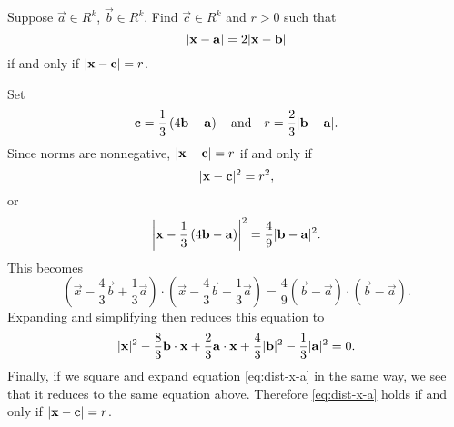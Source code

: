  Suppose $\vec{a}\in R^k$, $\vec{b}\in R^k$. Find
$\vec{c}\in R^k$ and $r > 0$ such that
\begin{equation}
  \label{eq:dist-x-a}
  \lvert{\mathbf{x}-\mathbf{a}}\rvert = 2\lvert{\mathbf{x}-\mathbf{b}}\rvert
\end{equation}
if and only if $\lvert{\mathbf{x} - \mathbf{c}}\rvert = r$.
\begin{solution}
  Set
  \begin{equation*}
    \mathbf{c} = \frac13\left(4\mathbf{b} - \mathbf{a}\right)
    \quad\text{and}\quad
    r = \frac23\lvert{\mathbf{b} - \mathbf{a}}\rvert.
  \end{equation*}
  Since norms are nonnegative, $\lvert{\mathbf{x}-\mathbf{c}}\rvert=r$ if and only
  if
  \begin{equation*}
    \lvert{\mathbf{x}-\mathbf{c}}\rvert^2 = r^2,
  \end{equation*}
  or
  \begin{equation*}
    \left\lvert{\mathbf{x} - \frac13\left(4\mathbf{b} - \mathbf{a}\right)}\right\rvert^2
    = \frac49\lvert{\mathbf{b}-\mathbf{a}}\rvert^2.
  \end{equation*}
  This becomes
  \begin{equation*}
    \left(\vec{x} - \frac43\vec{b} + \frac13\vec{a}\right)
    \cdot
    \left(\vec{x} - \frac43\vec{b} + \frac13\vec{a}\right)
    =
    \frac49(\vec{b}-\vec{a})\cdot(\vec{b}-\vec{a}).
  \end{equation*}
  Expanding and simplifying then reduces this equation to
  \begin{equation*}
    \lvert{\mathbf{x}}\rvert^2 - \frac83\mathbf{b}\cdot\mathbf{x}
    + \frac23\mathbf{a}\cdot\mathbf{x} + \frac43\lvert{\mathbf{b}}\rvert^2
    - \frac13\lvert{\mathbf{a}}\rvert^2 = 0.
  \end{equation*}
  Finally, if we square and expand equation \eqref{eq:dist-x-a} in the
  same way, we see that it reduces to the same equation
  above. Therefore \eqref{eq:dist-x-a} holds if and only if
  $\lvert{\mathbf{x}-\mathbf{c}}\rvert = r$.
\end{solution}
